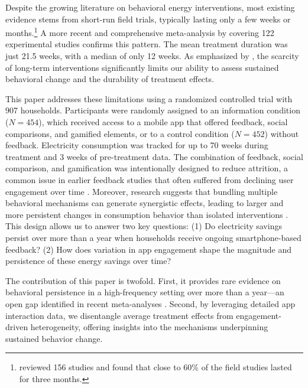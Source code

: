 Despite the growing literature on behavioral energy interventions, most existing evidence stems from short-run field trials, typically lasting only a few weeks or months.\footnote{\cite{delmasInformationStrategiesEnergy2013} reviewed  156 studies and found that close to 60\% of the field studies lasted for three months.} A more recent and comprehensive meta-analysis by \citet{khannaMulticountryMetaanalysisRole2021} covering 122 experimental studies confirms this pattern. The mean treatment duration was just 21.5 weeks, with a median of only 12 weeks. As emphasized by \citet[p.~928]{khannaMulticountryMetaanalysisRole2021}, the scarcity of long-term interventions significantly limits our ability to assess sustained behavioral change and the durability of treatment effects.

This paper addresses these limitations using a randomized controlled trial with 907 households. Participants were randomly assigned to an information condition ($N=454$), which received access to a mobile app that offered  feedback, social comparisons, and gamified elements, or to a control condition ($N=452$) without feedback. Electricity consumption was tracked for up to 70 weeks during treatment and 3 weeks of pre-treatment data. The combination of feedback, social comparison, and gamification was intentionally designed to reduce attrition, a common issue in earlier feedback studies that often suffered from declining user engagement over time \citep{buchananQuestionEnergyReduction2015, fischerFeedbackHouseholdElectricity2008}. Moreover, research suggests that bundling multiple behavioral mechanisms can generate synergistic effects, leading to larger and more persistent changes in consumption behavior than isolated interventions \citep{khannaMulticountryMetaanalysisRole2021}. This design allows us to answer two key questions: (1) Do electricity savings persist over more than a year when households receive ongoing smartphone-based feedback? (2) How does variation in app engagement shape the magnitude and persistence of these energy savings over time? 


The contribution of this paper is twofold. First, it provides rare evidence on behavioral persistence in a high-frequency setting over more than a year—an open gap identified in recent meta-analyses \citep{khannaMulticountryMetaanalysisRole2021}. Second, by leveraging detailed app interaction data, we disentangle average treatment effects from engagement-driven heterogeneity, offering insights into the mechanisms underpinning sustained behavior change. 


